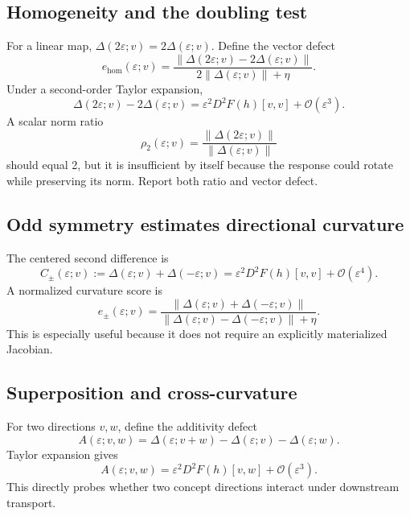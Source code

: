 \documentclass[11pt]{article}
\newcommand{\Norm}[1]{\left\lVert #1 \right\rVert}
\newcommand{\cO}{\mathcal{O}}
\newcommand{\eps}{\varepsilon}
\theoremstyle{definition}
\theoremstyle{remark}
\begin{document}
\subsection{Homogeneity and the doubling test}
For a linear map, $\Delta(2\eps;v)=2\Delta(\eps;v)$. Define the vector defect
\begin{equation}
  e_{\mathrm{hom}}(\eps;v)
  =\frac{\Norm{\Delta(2\eps;v)-2\Delta(\eps;v)}}
  {2\Norm{\Delta(\eps;v)}+\eta}.
  \label{eq:hom_defect}
\end{equation}
Under a second-order Taylor expansion,
\begin{equation}
  \Delta(2\eps;v)-2\Delta(\eps;v)
  =\eps^2 D^2F(h)[v,v]+\cO(\eps^3).
\end{equation}
A scalar norm ratio
\begin{equation}
  \rho_2(\eps;v)
  =\frac{\Norm{\Delta(2\eps;v)}}{\Norm{\Delta(\eps;v)}}
\end{equation}
should equal 2, but it is insufficient by itself because the response could rotate while preserving its norm. Report both ratio and vector defect.

\subsection{Odd symmetry estimates directional curvature}
The centered second difference is
\begin{equation}
  C_{\pm}(\eps;v)
  :=\Delta(\eps;v)+\Delta(-\eps;v)
  =\eps^2D^2F(h)[v,v]+\cO(\eps^4).
  \label{eq:odd_sym}
\end{equation}
A normalized curvature score is
\begin{equation}
  e_{\pm}(\eps;v)
  =\frac{\Norm{\Delta(\eps;v)+\Delta(-\eps;v)}}
  {\Norm{\Delta(\eps;v)-\Delta(-\eps;v)}+\eta}.
\end{equation}
This is especially useful because it does not require an explicitly materialized Jacobian.

\subsection{Superposition and cross-curvature}
For two directions $v,w$, define the additivity defect
\begin{equation}
  A(\eps;v,w)
  =\Delta(\eps;v+w)-\Delta(\eps;v)-\Delta(\eps;w).
  \label{eq:additivity}
\end{equation}
Taylor expansion gives
\begin{equation}
  A(\eps;v,w)
  =\eps^2D^2F(h)[v,w]+\cO(\eps^3).
  \label{eq:additivity_hess}
\end{equation}
This directly probes whether two concept directions interact under downstream transport.
\end{document}
